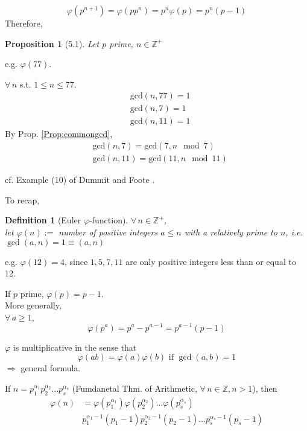 \documentclass[10pt]{amsart}
\newtheorem{proposition}{Proposition}
\newtheorem{definition}{Definition}
\begin{document}
\begin{multicols*}{2}
\[
\varphi(p^{n+1}) = \varphi(pp^{n}) = p^n\varphi(p) = p^n(p-1)
\]
Therefore,
\begin{proposition}[5.1]
Let $p$ prime, $n\in \mathbb{Z}^+$
\end{proposition}


e.g. $\varphi(77)$.  

$\forall \, n $ s.t. $1\leq n \leq 77$.  
\[
\begin{aligned}
	& \text{gcd}(n,77)=1 \\ 
	& \text{gcd}(n,7)=1 \\ 
	& \text{gcd}(n,11)=1  
\end{aligned}
\]
By Prop. \ref{Prop:commongcd}, 
\[
\begin{aligned}
	& \text{gcd}(n,7) = \text{gcd}(7, n\mod{7}) \\ 
	& \text{gcd}(n,11) = \text{gcd}(11, n\mod{11}) 
\end{aligned}
\]

cf. Example (10) of Dummit and Foote \cite{DuFo2003}.  

To recap, 
\begin{definition}[Euler $\varphi$-function]
$\forall \, n \in \mathbb{Z}^+$, \\
let $\varphi(n)  := $ number of positive integers $a \leq n$ with a relatively prime to $n$, i.e. $\gcd(a,n) = 1 \equiv (a,n)$
\end{definition}
e.g. $\varphi(12)=4$, since $1,5,7,11$ are only positive integers less than or equal to 12.  

If $p$ prime, 
$\varphi(p) = p-1$.  \\
More generally, \\
$\forall \, a \geq 1$, 
\begin{equation}\label{Eq:EulerTotientOfPrimeFactor}
\boxed{ \varphi(p^a) = p^a - p^{a-1} = p^{a-1} (p-1) }
\end{equation}

$\varphi$ is multiplicative in the sense that 
\begin{equation}\label{Eq:EulerTotientIsMultiplicative}
\varphi(ab) = \varphi(a) \varphi(b)  \text{ if } \gcd(a,b) = 1
\end{equation}
$\Longrightarrow $ general formula.  

If $n=p_1^{\alpha_1}p_2^{\alpha_2} \dots p_s^{\alpha_s}$ (Fumdanetal Thm. of Arithmetic, $\forall \, n \in \mathbb{Z}, n>1$), then 
\begin{equation}
\boxed{ 
	\begin{aligned}
	\varphi(n) & = \varphi(p_1^{\alpha_1})  \varphi(p_2^{\alpha_2}) \dots \varphi(p_s^{\alpha_s}) \\ 
	& p_1^{\alpha_1 - 1 } (p_1 - 1) p_2^{\alpha_2 - 1} (p_2 - 1 ) \dots p_s^{\alpha_s -1} (p_s - 1) 
	\end{aligned} }
\end{equation}



\end{multicols*}
\end{document}
